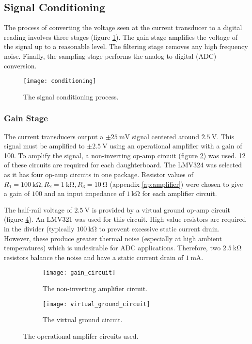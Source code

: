 \subsection{Signal Conditioning}

The process of converting the voltage seen at the current transducer to a digital reading involves three stages (figure \ref{fig:conditioning}).
The gain stage amplifies the voltage of the signal up to a reasonable level.
The filtering stage removes any high frequency noise.
Finally, the sampling stage performs the analog to digital (ADC) conversion.
\begin{figure}[h]
	\centering
	\texttt{[image: conditioning]}
	\caption{The signal conditioning process.}
	\label{fig:conditioning}
\end{figure}

\subsubsection{Gain Stage}

The current transducers output a $\pm \SI{25}{\milli\volt}$ signal centered around $\SI{2.5}{\volt}$.
This signal must be amplified to $\pm \SI{2.5}{\volt}$ using an operational amplifier with a gain of 100.
To amplify the signal, a non-inverting op-amp circuit (figure \ref{fig:non-inverting-op-amp}) was used.
12 of these circuits are required for each daughterboard.
The LMV324 was selected as it has four op-amp circuits in one package.
Resistor values of $R_1 = \SI{100}{\kilo\ohm}, R_2 = \SI{1}{\kilo\ohm}, R_3 = \SI{10}{\ohm}$ (appendix \ref{ap:amplifier}) were chosen to give a gain of $100$ and an input impedance of $\SI{1}{\kilo\ohm}$ for each amplifier circuit.

The half-rail voltage of $\SI{2.5}{\volt}$ is provided by a virtual ground op-amp circuit (figure \ref{fig:half-supply}).
An LMV321 was used for this circuit.
High value resistors are required in the divider (typically $\SI{100}{\kilo\ohm}$ to prevent excessive static current drain.
However, these produce greater thermal noise (especially at high ambient temperatures) which is undesirable for ADC applications.
Therefore, two $\SI{2.5}{\kilo\ohm}$ resistors balance the noise and have a static current drain of $\SI{1}{\milli\ampere}$.

\begin{figure}[hb!]
\centering
\hfill
\begin{subfigure}[c]{0.45\textwidth}
	\centering
	\texttt{[image: gain\_circuit]}
	\caption{The non-inverting amplifier circuit.}
	\label{fig:non-inverting-op-amp}
\end{subfigure}
\hfill
\begin{subfigure}[c]{0.45\textwidth}
	\centering
	\texttt{[image: virtual\_ground\_circuit]}
	\caption{The virtual ground circuit.}
	\label{fig:half-supply}
\end{subfigure}
\hfill
\caption{The operational amplifer circuits used.}
\end{figure}

